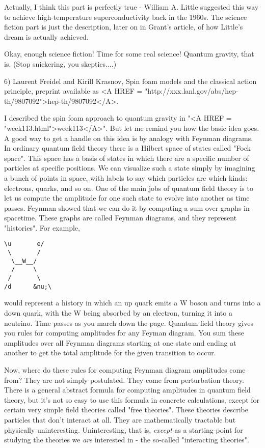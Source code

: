 Actually, I think this part is perfectly true - William A. Little
suggested this way to achieve high-temperature superconductivity back in
the 1960s.  The science fiction part is just the description, later on
in Grant's article, of how Little's dream is actually achieved.

Okay, enough science fiction!  Time for some real science!  Quantum
gravity, that is.  (Stop snickering, you skeptics....)

6) Laurent Freidel and Kirill Krasnov, Spin foam models and the 
classical action principle, preprint available as <A HREF = "http://xxx.lanl.gov/abs/hep-th/9807092">hep-th/9807092</A>.

I described the spin foam approach to quantum gravity in "<A HREF = "week113.html">week113</A>".  But
let me remind you how the basic idea goes.  A good way to get a handle
on this idea is by analogy with Feynman diagrams.  In ordinary quantum
field theory there is a Hilbert space of states called "Fock space".
This space has a basis of states in which there are a specific number of
particles at specific positions.  We can visualize such a state simply
by imagining a bunch of points in space, with labels to say which
particles are which kinds: electrons, quarks, and so on.  One of the
main jobs of quantum field theory is to let us compute the amplitude for
one such state to evolve into another as time passes.  Feynman showed
that we can do it by computing a sum over graphs in spacetime.  These
graphs are called Feynman diagrams, and they represent "histories".  For example,
\begin{verbatim}
\u       e/
 \       /
  \__W__/
  /     \
 /       \
/d      &nu;\
\end{verbatim}
    
would represent a history in which an up quark emits a W boson and turns
into a down quark, with the W being absorbed by an electron, turning it
into a neutrino.  Time passes as you march down the page.  Quantum field
theory gives you rules for computing amplitudes for any Feyman diagram.
You sum these amplitudes over all Feynman diagrams starting at one state
and ending at another to get the total amplitude for the given transition
to occur.

Now, where do these rules for computing Feynman diagram amplitudes
come from?  They are not simply postulated.  They come from perturbation
theory.  There is a general abstract formula for computing amplitudes in
quantum field theory, but it's not so easy to use this formula in
concrete calculations, except for certain very simple field theories
called "free theories".  These theories describe particles
that don't interact at all.  They are mathematically tractable but
physically uninteresting.  Uninteresting, that is, \emph{except} as a
starting-point for studying the theories we \emph{are} interested in -
the so-called "interacting theories".

